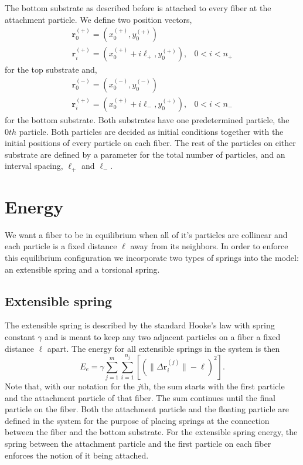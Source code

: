 	The bottom substrate as described before is attached to every fiber at the attachment particle. We define two position vectors,
\begin{eqnarray}
	\textbf{r}_0^{(+)} = (x_0^{(+)},y_0^{(+)}) & \\
	\textbf{r}_i^{(+)} = (x_0^{(+)} + i\ell_+,y_0^{(+)}), & 0 < i < n_+
\end{eqnarray}
for the top substrate and,
\begin{eqnarray}
	\textbf{r}_0^{(-)} = (x_0^{(-)},y_0^{(-)}) & \\
	\textbf{r}_i^{(+)} = (x_0^{(+)} + i\ell_-,y_0^{(+)}), & 0 < i < n_-
\end{eqnarray} 
for the bottom substrate. Both substrates have one predetermined particle, the $0th$ particle. Both particles are decided as initial conditions together with the initial positions of every particle on each fiber. The rest of the particles on either substrate are defined by a parameter for the total number of particles, and an interval spacing, $\ell_+$ and $\ell_-$.

\section{Energy}

	We want a fiber to be in equilibrium when all of it's particles are collinear and each particle is a fixed distance $\ell$ away from its neighbors. In order to enforce this equilibrium configuration we incorporate two types of springs into the model: an extensible spring and a torsional spring.

\subsection{Extensible spring}

	The extensible spring is described by the standard Hooke's law with spring constant $\gamma$ and is meant to keep any two adjacent particles on a fiber a fixed distance $\ell$ apart. The energy for all extensible springs in the system is then
\begin{equation}
	E_e = \gamma \sum_{j=1}^m \sum_{i=1}^{n_j} \left[ \left( \|\Delta \textbf{r}_i^{(j)} \| - \ell \right)^2 \right].
\end{equation}
Note that, with our notation for the $j$th, the sum starts with the first particle and the attachment particle of that fiber. The sum continues until the final particle on the fiber. Both the attachment particle and the floating particle are defined in the system for the purpose of placing springs at the connection between the fiber and the bottom substrate. For the extensible spring energy, the spring between the attachment particle and the first particle on each fiber enforces the notion of it being attached.

